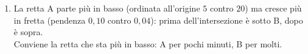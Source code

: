 \begin{question}[ID=4.3, subtitle={Confronto tra due piani telefonici}, difficulty=difficile, tags={sistemi, break-even, grafici}]
\begin{explanation}
\begin{enumerate}[label=\alph*),leftmargin=1.8cm]
    \[\begin{aligned}
    5+0{,}10x &= 20+0{,}04x\\
    0{,}06x &= 15\\
    x &= 250\\
    y &= 5+0{,}10\cdot250=30
    \end{aligned}\]
    \item La retta A parte più in basso (ordinata all'origine $5$ contro $20$) ma cresce più in fretta (pendenza $0{,}10$ contro $0{,}04$): prima dell'intersezione è sotto B, dopo è sopra. \\
    Conviene la retta che sta più in basso: A per pochi minuti, B per molti.
\end{enumerate}
\end{explanation}
\end{question}


